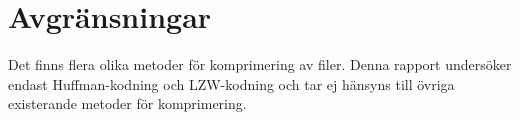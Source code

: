 \section{Avgränsningar}
\label{sec:delimitations}

Det finns flera olika metoder för komprimering av filer. Denna rapport undersöker endast Huffman-kodning och LZW-kodning och tar ej hänsyns till övriga existerande metoder för komprimering.




